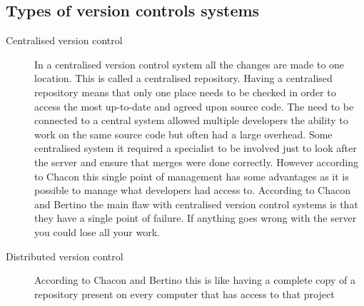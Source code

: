 % 

\subsection{Types of version controls systems}
\begin{description}

  \item [Centralised version control] 
  In a centralised version control system all the changes are made to one location.  This is called a centralised repository. Having a centralised repository means that only one place needs to be checked in order to access the most up-to-date and agreed upon source code. The need to be connected to a central system allowed multiple developers the ability to work on the same source code but often had a large overhead. Some centralised system it required a specialist to be involved just to look after the server and ensure that merges were done correctly. However according to Chacon \cite{Chacon2009} this single point of management has some advantages as it is possible to manage what developers had access to. According to Chacon \cite{Chacon2009} and Bertino \cite{Bertino2012} the main flaw with centralised version control systems is that they have a single point of failure. If anything goes wrong with the server you could lose all your work.

  \item [Distributed version control] 
  According to Chacon \cite{Chacon2009} and Bertino \cite{Bertino2012} this is like having a complete copy of a repository present on every computer that has access to that project


\end{description}
